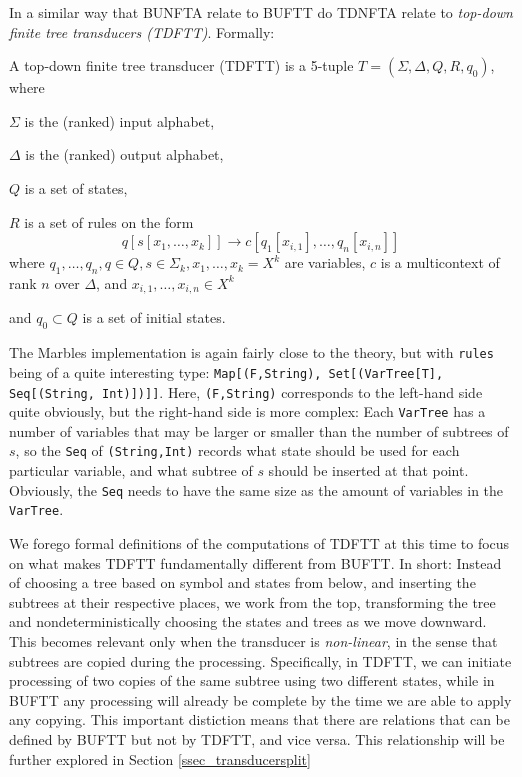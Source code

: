 In a similar way that BUNFTA relate to BUFTT do TDNFTA relate to
\emph{top-down finite tree transducers (TDFTT)}. Formally:

A top-down finite tree transducer (TDFTT) is a 5-tuple $T = (\Sigma,
\Delta, Q, R, q_0)$, where
\begin{compactitem}
\item $\Sigma$ is the (ranked) input alphabet,
\item $\Delta$ is the (ranked) output alphabet,
\item $Q$ is a set of states,
\item $R$ is a set of rules on the form
$$q[s[x_1,\ldots,x_k]] \rightarrow c[q_1[x_{i,1}],\ldots,q_n[x_{i,n}]]$$ where
$q_1,\ldots,q_n,q \in Q, s \in \Sigma_k, x_1,\ldots,x_k = X^k$ are variables,
$c$ is a multicontext of rank $n$ over $\Delta$, and $x_{i,1},\ldots,x_{i,n} \in X^k$
\item and $q_0 \subset Q$ is a set of initial states.
\end{compactitem}

The Marbles implementation is again fairly close to the theory, but with
\texttt{rules} being of a quite interesting type: \texttt{Map[(F,String),
Set[(VarTree[T], Seq[(String, Int)])]]}. Here, \texttt{(F,String)}
corresponds to the left-hand side quite obviously, but the right-hand side
is more complex: Each \texttt{VarTree} has a number of variables that may
be larger or smaller than the number of subtrees of $s$, so the \texttt{Seq} of
\texttt{(String,Int)} records what state should be used for each particular
variable, and what subtree of $s$ should be inserted at that point.
Obviously, the \texttt{Seq} needs to have the same size as the amount of
variables in the \texttt{VarTree}.

We forego formal definitions of the computations of TDFTT at this time to
focus on what makes TDFTT fundamentally different from BUFTT. In short:
Instead of choosing a tree based on symbol and states from below, and
inserting the subtrees at their respective places, we work from the top,
transforming the tree and nondeterministically choosing the states and
trees as we move downward.  This becomes relevant only when the transducer
is \emph{non-linear}, in the sense that subtrees are copied during the
processing. Specifically, in TDFTT, we can initiate processing of two
copies of the same subtree using two different states, while in BUFTT any
processing will already be complete by the time we are able to apply any
copying. This important distiction means that there are relations that can
be defined by BUFTT but not by TDFTT, and vice versa. This relationship
will be further explored in Section \ref{ssec_transducersplit}


